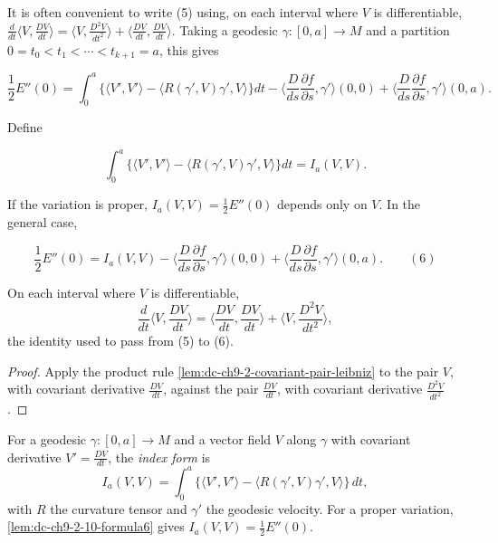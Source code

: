 \begin{remark}
  \label{rem:dc-ch9-2-10}
  \sketch
  It is often convenient to write (5) using, on each interval where $V$ is
  differentiable,
  $\frac{d}{dt}\langle V,\frac{DV}{dt}\rangle=\langle V,\frac{D^2 V}{dt^2}\rangle+\langle\frac{DV}{dt},\frac{DV}{dt}\rangle$.
  Taking a geodesic $\gamma:[0,a]\to M$ and a partition
  $0=t_0<t_1<\cdots<t_{k+1}=a$, this gives

  $$
  \frac{1}{2}E''(0)=\int_0^a\{\langle V',V'\rangle-\langle R(\gamma',V)\gamma',V\rangle\}dt-\Big\langle\frac{D}{ds}\frac{\partial f}{\partial s},\gamma'\Big\rangle(0,0)+\Big\langle\frac{D}{ds}\frac{\partial f}{\partial s},\gamma'\Big\rangle(0,a).
  $$

  Define

  $$
  \int_0^a\{\langle V',V'\rangle-\langle R(\gamma',V)\gamma',V\rangle\}dt=I_a(V,V).
  $$

  If the variation is proper, $I_a(V,V)=\frac{1}{2}E''(0)$ depends only on $V$. In
  the general case,

  $$
  \frac{1}{2}E''(0)=I_a(V,V)-\Big\langle\frac{D}{ds}\frac{\partial f}{\partial s},\gamma'\Big\rangle(0,0)+\Big\langle\frac{D}{ds}\frac{\partial f}{\partial s},\gamma'\Big\rangle(0,a).\qquad(6)
  $$
\end{remark}
\begin{lemma}
  \label{lem:dc-ch9-2-10-differentiation}
  \leanok
  On each interval where $V$ is differentiable,
  $$
  \frac{d}{dt}\Big\langle V,\frac{DV}{dt}\Big\rangle
    =\Big\langle\frac{DV}{dt},\frac{DV}{dt}\Big\rangle
     +\Big\langle V,\frac{D^2V}{dt^2}\Big\rangle,
  $$
  the identity used to pass from (5) to (6).
\end{lemma}
\begin{proof}
  \leanok
  \sketch
  Apply the product rule \cref{lem:dc-ch9-2-covariant-pair-leibniz} to the pair $V$, with
  covariant derivative $\frac{DV}{dt}$, against the pair $\frac{DV}{dt}$, with covariant
  derivative $\frac{D^2V}{dt^2}$.
\end{proof}
\begin{definition}
  \label{def:dc-ch9-2-10-index-form}
  \leanok
  For a geodesic $\gamma:[0,a]\to M$ and a vector field $V$ along $\gamma$ with covariant
  derivative $V'=\frac{DV}{dt}$, the \emph{index form} is
  $$
  I_a(V,V)=\int_0^a\{\langle V',V'\rangle-\langle R(\gamma',V)\gamma',V\rangle\}\,dt,
  $$
  with $R$ the curvature tensor and $\gamma'$ the geodesic velocity. For a
  proper variation, \cref{lem:dc-ch9-2-10-formula6} gives
  $I_a(V,V)=\frac{1}{2}E''(0)$.
\end{definition}
